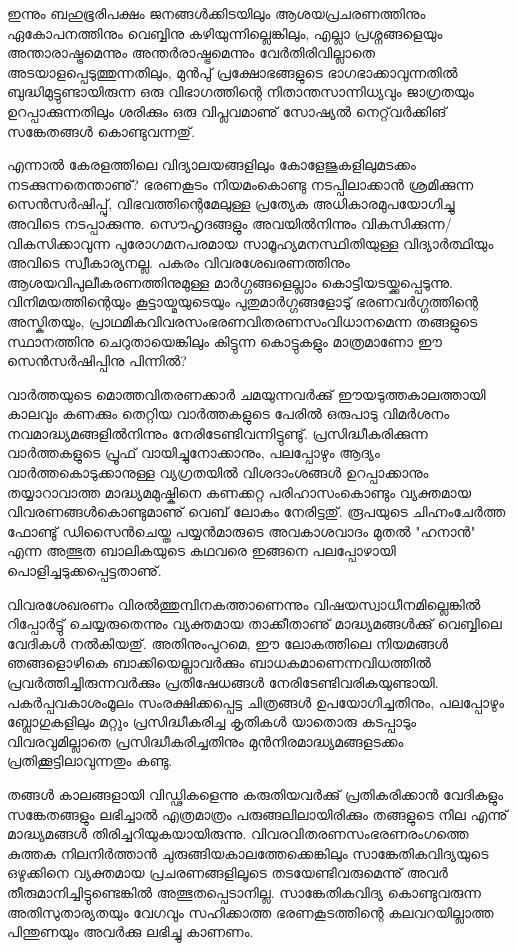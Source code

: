 ഇന്നും ബഹുഭൂരിപക്ഷം ജനങ്ങള്‍ക്കിടയിലും ആശയപ്രചരണത്തിനും ഏകോപനത്തിനും വെബ്ബിനു കഴിയുന്നില്ലെങ്കിലും, എല്ലാ 
പ്രശ്നങ്ങളെയും അന്താരാഷ്ട്രമെന്നും അന്തര്‍രാഷ്ട്രമെന്നും വേര്‍തിരിവില്ലാതെ അടയാളപ്പെടുത്തുന്നതിലും, മുന്‍പു് പ്രക്ഷോഭങ്ങളുടെ 
ഭാഗഭാക്കാവുന്നതില്‍ ബുദ്ധിമുട്ടുണ്ടായിരുന്ന ഒരു വിഭാഗത്തിന്റെ നിതാന്തസാന്നിധ്യവും ജാഗ്രതയും ഉറപ്പാക്കുന്നതിലും ശരിക്കും ഒരു 
വിപ്ലവമാണു് സോഷ്യല്‍ നെറ്റ്‌വര്‍ക്കിങ് സങ്കേതങ്ങള്‍ കൊണ്ടുവന്നതു്.

എന്നാല്‍ കേരളത്തിലെ വിദ്യാലയങ്ങളിലും കോളേജുകളിലുമടക്കം നടക്കുന്നതെന്താണു്? ഭരണകൂടം നിയമംകൊണ്ടു 
നടപ്പിലാക്കാന്‍ ശ്രമിക്കുന്ന സെന്‍സര്‍ഷിപ്പു്, വിഭവത്തിന്റെമേലുള്ള പ്രത്യേക അധികാരമുപയോഗിച്ചു അവിടെ നടപ്പാക്കുന്നു. 
സൌഹൃദങ്ങളും അവയില്‍നിന്നും വികസിക്കുന്ന/വികസിക്കാവുന്ന പുരോഗമനപരമായ സാമൂഹ്യമനസ്ഥിതിയുള്ള വിദ്യാര്‍ത്ഥിയും 
അവിടെ സ്വീകാര്യനല്ല. പകരം വിവരശേഖരണത്തിനും ആശയവിപുലീകരണത്തിനുമുള്ള മാര്‍ഗ്ഗങ്ങളെല്ലാം 
കൊട്ടിയടയ്ക്കപ്പെടുന്നു. വിനിമയത്തിന്റെയും കൂട്ടായ്മയുടെയും പുതുമാര്‍ഗ്ഗങ്ങളോടു് ഭരണവര്‍ഗ്ഗത്തിന്റെ അസ്കിതയും, 
പ്രാഥമികവിവരസംഭരണവിതരണസംവിധാനമെന്ന തങ്ങളുടെ സ്ഥാനത്തിനു ചെറുതായെങ്കിലും കിട്ടുന്ന കൊട്ടുകളും 
മാത്രമാണോ ഈ സെന്‍സര്‍ഷിപ്പിനു പിന്നില്‍?

വാര്‍ത്തയുടെ മൊത്തവിതരണക്കാര്‍ ചമയുന്നവര്‍ക്കു് ഈയടുത്തകാലത്തായി കാലവും കണക്കും തെറ്റിയ വാര്‍ത്തകളുടെ പേരില്‍ 
ഒരുപാടു വിമര്‍ശനം നവമാദ്ധ്യമങ്ങളില്‍നിന്നും നേരിടേണ്ടിവന്നിട്ടുണ്ടു്. പ്രസിദ്ധീകരിക്കുന്ന വാര്‍ത്തകളുടെ പ്രൂഫ് വായിച്ചുനോക്കാനും, 
പലപ്പോഴും ആദ്യം വാര്‍ത്തകൊടുക്കാനുള്ള വ്യഗ്രതയില്‍ വിശദാംശങ്ങള്‍ ഉറപ്പാക്കാനും തയ്യാറാവാത്ത മാദ്ധ്യമമുഷ്കിനെ 
കണക്കറ്റ പരിഹാസംകൊണ്ടും വ്യക്തമായ വിവരണങ്ങള്‍കൊണ്ടുമാണു് വെബ് ലോകം നേരിട്ടതു്. രൂപയുടെ ചിഹ്നംചേര്‍ത്ത ഫോണ്ടു് 
ഡിസൈന്‍ചെയ്ത പയ്യന്‍മാരുടെ അവകാശവാദം മുതല്‍ "ഹനാന്‍" എന്ന അത്ഭുത ബാലികയുടെ കഥവരെ ഇങ്ങനെ പലപ്പോഴായി 
പൊളിച്ചടുക്കപ്പെട്ടതാണു്.

വിവര​ശേഖരണം വിരല്‍ത്തുമ്പിനകത്താണെന്നും വിഷയസ്വാധീനമില്ലെങ്കില്‍ റിപ്പോര്‍ട്ടു് ചെയ്യരുതെന്നും വ്യക്തമായ താക്കീതാണു് 
മാദ്ധ്യമങ്ങള്‍ക്കു് വെബ്ബിലെ വേദികള്‍ നല്‍കിയതു്. അതിനുംപുറമെ, ഈ ലോകത്തിലെ നിയമങ്ങള്‍ ഞങ്ങളൊഴികെ 
ബാക്കിയെല്ലാവര്‍ക്കും ബാധകമാണെന്നവിധത്തില്‍ പ്രവര്‍ത്തിച്ചിരുന്നവര്‍ക്കും പ്രതിഷേധങ്ങള്‍ നേരിടേണ്ടിവരികയുണ്ടായി.
 പകര്‍പ്പവകാശംമൂലം സംരക്ഷിക്കപ്പെട്ട ചിത്രങ്ങള്‍ ഉപയോഗിച്ചതിനും, പലപ്പോഴും ബ്ലോഗുകളിലും മറ്റും പ്രസിദ്ധീകരിച്ച കൃതികള്‍ 
യാതൊരു കടപ്പാടും വിവരവുമില്ലാതെ പ്രസിദ്ധീകരിച്ചതിനും മുന്‍നിരമാദ്ധ്യമങ്ങളടക്കം പ്രതിക്കൂട്ടിലാവുന്നതും കണ്ടു.

തങ്ങള്‍ കാലങ്ങളായി വിഡ്ഢികളെന്നു കരുതിയവര്‍ക്കു് പ്രതികരിക്കാന്‍ വേദികളും സങ്കേതങ്ങളും ലഭിച്ചാല്‍ എത്രമാത്രം 
പരുങ്ങലിലായിരിക്കും തങ്ങളുടെ നില എന്നു് മാദ്ധ്യമങ്ങള്‍ തിരിച്ചറിയുകയായിരുന്നു. വിവരവിതരണസംഭരണരംഗത്തെ 
കുത്തക നിലനിര്‍ത്താന്‍ ചുരുങ്ങിയകാലത്തേക്കെങ്കിലും സാങ്കേതികവിദ്യയുടെ ഒഴുക്കിനെ വ്യക്തമായ പ്രചരണങ്ങളിലൂടെ 
തടയേണ്ടിവരുമെന്നു് അവര്‍ തീരുമാനിച്ചിട്ടുണ്ടെങ്കില്‍ അത്ഭുതപ്പെടാനില്ല. സാങ്കേതികവിദ്യ കൊണ്ടുവരുന്ന അതിസുതാര്യതയും 
വേഗവും സഹിക്കാത്ത ഭരണകൂടത്തിന്റെ കലവറയില്ലാത്ത പിന്തുണയും അവര്‍ക്കു ലഭിച്ചു കാണണം.


